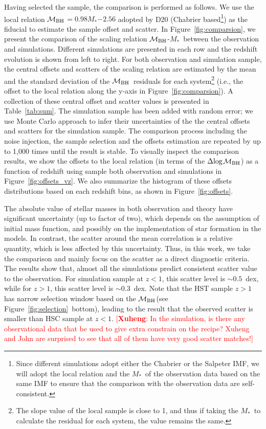 \documentclass[twocolumn]{aastex631}
\newcommand{\ding}[1]{\textcolor{red}{[{\bf Xuheng}: #1]}}
\def\smass{{$M_*$}}
\def\mbh{$\mathcal M_{\rm BH}$}
\begin{document}
Having selected the sample, the comparison is performed as follows. We use the local relation \mbh$=0.98$\smass$-2.56$ adopted by D20 (Chabrier based\footnote{Since different simulations adopt either the Chabrier or the Salpeter IMF, we will adopt the local relation and the \smass\ of the observation data based on the same IMF to ensure that the comparison with the observation data are self-consistent.}) as the fiducial to estimate the sample offset and scatter.  In Figure~\ref{fig:comparsion}, we present the comparison of the scaling relation \mbh-\smass\ between the observation and simulations. Different simulations are presented in each row and the redshift evolution is shown from left to right. 
For both observation and simulation sample, the central offsets and scatters of the scaling relation are estimated by the mean and the standard deviation of the \mbh\ residuals for each system\footnote{The slope value of the local sample is close to 1, and thus if taking the \smass\ to calculate the residual  for each system, the value remains the same.} (i.e., the offset to the local relation along the y-axis in Figure~\ref{fig:comparsion}).
A collection of these central offset and scatter values is presented in Table~\ref{tab:sum}. The simulation sample has been added with random error; we use Monte Carlo approach to infer their uncertainties of the the central offsets and scatters for the simulation sample. The comparison process including the noise injection, the sample selection and the offsets estimation are repeated by up to 1,000 times until the result is stable. To visually inspect the comparison results, we show the offsets to the local relation (in terms of the $\Delta{\rm log}$\mbh) as a function of redshift using sample both observation and simulations in Figure~\ref{fig:offsets_vz}. We also summarize the histogram of these offsets distributions based on each redshift bins, as shown in Figure~\ref{fig:offsets}.

The absolute value of stellar masses in both observation and theory have significant uncertainty (up to factor of two), which depends on the assumption of initial mass function, and possibly on the implementation of star formation in the models. In contrast, the scatter around the mean correlation is a relative quantity, which is less affected by this uncertainty. Thus, in this work, we take the comparison and mainly focus on the scatter as a direct diagnostic criteria. The results show that, almost all the simulations predict consistent scatter value to the observation. For simulation sample at $z<1$, this scatter level is $\sim0.5$~dex, while for $z>1$, this scatter level is $\sim0.3$~dex. Note that the HST sample $z>1$ has narrow selection window based on the \mbh (see Figure~\ref{fig:selection}~bottom), leading to the result that the observed scatter is smaller than HSC sample at $z<1$.
\ding{In the simulation, is there any observational data that be used to give extra constrain on the recipe? Xuheng and John are surprised to see that all of them have very good scatter matches!}
\end{document}
